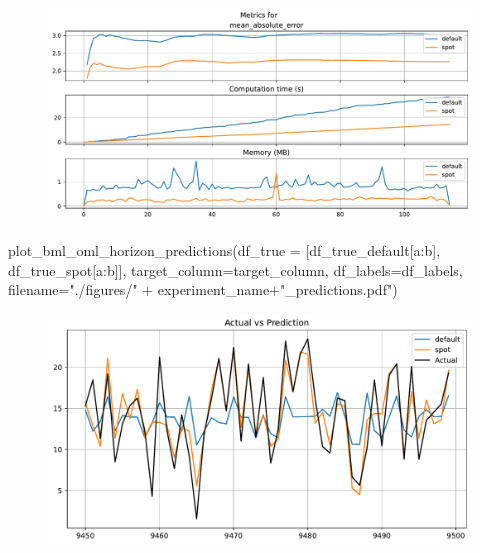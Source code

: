 \documentclass[
  letterpaper,
  DIV=11,
  numbers=noendperiod]{scrreprt}
\newenvironment{Shaded}{\begin{snugshade}}{\end{snugshade}}
\newcommand{\NormalTok}[1]{\textcolor[rgb]{0.00,0.23,0.31}{#1}}
\newcommand{\OperatorTok}[1]{\textcolor[rgb]{0.37,0.37,0.37}{#1}}
\newcommand{\StringTok}[1]{\textcolor[rgb]{0.13,0.47,0.30}{#1}}
\begin{document}
\begin{figure}[H]

{\centering \includegraphics{024_spot_hpt_river_friedman_hatr_files/figure-pdf/cell-34-output-1.pdf}

}

\end{figure}

\begin{Shaded}
\begin{Highlighting}[]
\NormalTok{plot\_bml\_oml\_horizon\_predictions(df\_true }\OperatorTok{=}\NormalTok{ [df\_true\_default[a:b], df\_true\_spot[a:b]], target\_column}\OperatorTok{=}\NormalTok{target\_column,  df\_labels}\OperatorTok{=}\NormalTok{df\_labels, filename}\OperatorTok{=}\StringTok{"./figures/"} \OperatorTok{+}\NormalTok{ experiment\_name}\OperatorTok{+}\StringTok{"\_predictions.pdf"}\NormalTok{)}
\end{Highlighting}
\end{Shaded}

\begin{figure}[H]

{\centering \includegraphics{024_spot_hpt_river_friedman_hatr_files/figure-pdf/cell-35-output-1.pdf}

}

\end{figure}
\end{document}
